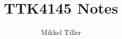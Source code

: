 \documentclass[11pt, a4paper, USenglish]{article}
\begin{document}
\title{TTK4145 Notes}
\author{Mikkel Tiller}
\date{}
\maketitle

\newpage

\newpage

\newpage

\newpage

\end{document}
